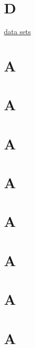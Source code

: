 \documentclass[]{book}
\begin{document}
\hypertarget{d}{%
\chapter*{D}\label{d}}

\href{https://linkedin-learning.pxf.io/rwkly_dataSets}{data sets}

\hypertarget{a-2}{%
\chapter*{A}\label{a-2}}

\hypertarget{a-3}{%
\chapter*{A}\label{a-3}}

\hypertarget{a-4}{%
\chapter*{A}\label{a-4}}

\hypertarget{a-5}{%
\chapter*{A}\label{a-5}}

\hypertarget{a-6}{%
\chapter*{A}\label{a-6}}

\hypertarget{a-7}{%
\chapter*{A}\label{a-7}}

\hypertarget{a-8}{%
\chapter*{A}\label{a-8}}

\hypertarget{a-9}{%
\chapter*{A}\label{a-9}}
\end{document}

